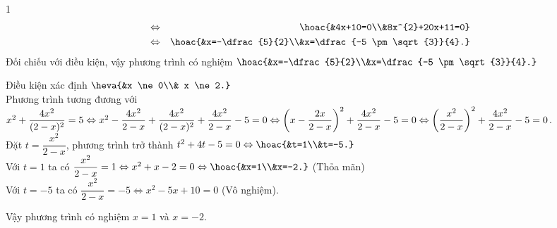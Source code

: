 \begin{bt}
{\begin{enumEX}{1}
\begin{eqnarray*}
				& \Leftrightarrow & \hoac{&4x+10=0\\&8x^{2}+20x+11=0} \\
				& \Leftrightarrow &\hoac{&x=-\dfrac{5}{2}\\&x=\dfrac{-5 \pm \sqrt{3}}{4}.}
			\end{eqnarray*}
			Đối chiếu với điều kiện, vậy phương trình có nghiệm $\hoac{&x=-\dfrac{5}{2}\\&x=\dfrac{-5 \pm \sqrt{3}}{4}.}$
			\item Điều kiện xác định $\heva{&x \ne 0\\& x \ne 2.}$\\
			Phương trình tương đương với\\ $x^{2}+\dfrac{4x^{2}}{(2-x)^{2}}=5 \Leftrightarrow x^{2}- \dfrac{4x^{2}}{2-x} +\dfrac{4x^{2}}{(2-x)^{2}} + \dfrac{4x^{2}}{2-x}-5=0 \Leftrightarrow \left( x-\dfrac{2x}{2-x}\right)^{2} + \dfrac{4x^{2}}{2-x}-5=0 \\ \Leftrightarrow \left(\dfrac{x^{2}}{2-x} \right)^{2} + \dfrac{4x^{2}}{2-x}-5=0$.\\
			Đặt $t=\dfrac{x^{2}}{2-x}$, phương trình trở thành $t^{2}+4t-5=0 \Leftrightarrow \hoac{&t=1\\&t=-5.}$\\
			Với $t=1$ ta có $\dfrac{x^{2}}{2-x} =1 \Leftrightarrow x^{2}+x-2=0 \Leftrightarrow \hoac{&x=1\\&x=-2.}$ (Thỏa mãn)\\
			Với $t=-5$ ta có $\dfrac{x^{2}}{2-x} =-5	 \Leftrightarrow x^{2}-5x+10=0$ (Vô nghiệm).
				
		Vậy phương trình có nghiệm $x=1$ và $x=-2$.
		\end{enumEX}
	}		
\end{bt}


